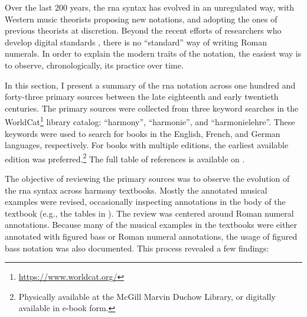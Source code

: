 

Over the last 200 years, the \gls{rna} syntax has evolved in
an unregulated way, with Western music theorists proposing
new notations, and adopting the ones of previous theorists
at discretion. Beyond the recent efforts of researchers who
develop digital standards \parencite{huron1994humdrum,
neuwirth2018annotated, gotham2019romantext,
hentschel2021annotated}, there is no ``standard'' way of
writing Roman numerals. In order to explain the modern
traits of the notation, the easiest way is to observe,
chronologically, its practice over time.

In this section, I present a summary of the \gls{rna}
notation across one hundred and forty-three primary sources
between the late eighteenth and early twentieth centuries.
The primary sources were collected from three keyword
searches in the
WorldCat\footnote{\href{https://www.worldcat.org/}{https://www.worldcat.org/}}
library catalog: ``harmony'', ``harmonie'', and
``harmonielehre''. These keywords were used to search for
books in the English, French, and German languages,
respectively. For books with multiple editions, the earliest
available edition was preferred.\footnote{Physically
available at the McGill Marvin Duchow Library, or digitally
available in e-book form.} The full table of references is
available on .



The objective of reviewing the primary sources was to
observe the evolution of the \gls{rna} syntax across harmony
textbooks. Mostly the annotated musical examples were
revised, occasionally inspecting annotations in the body of
the textbook (e.g., the tables in
\textcite{kirnberger1774kunst}). The review was centered
around Roman numeral annotations. Because many of the
musical examples in the textbooks were either annotated with
figured bass or Roman numeral annotations, the usage of
figured bass notation was also documented. This process
revealed a few findings:

